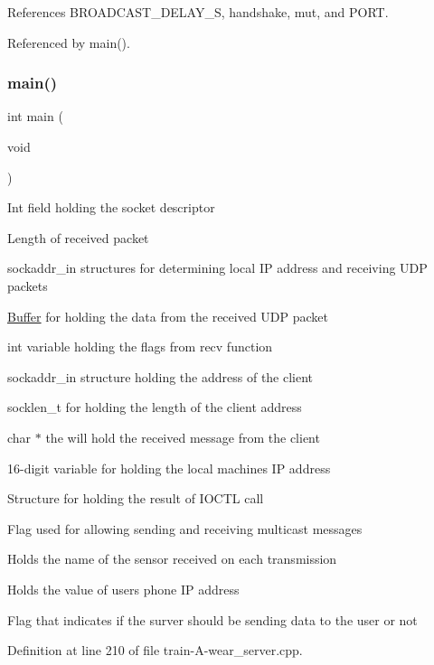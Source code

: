 References B\+R\+O\+A\+D\+C\+A\+S\+T\+\_\+\+D\+E\+L\+A\+Y\+\_\+S, handshake, mut, and P\+O\+RT.



Referenced by main().

\mbox{\label{train-_a-wear__server_8cpp_a840291bc02cba5474a4cb46a9b9566fe}} 
\subsubsection{\texorpdfstring{main()}{main()}}
{\footnotesize\ttfamily int main (\begin{DoxyParamCaption}\item[{void}]{ }\end{DoxyParamCaption})}

Int field holding the socket descriptor

Length of received packet

sockaddr\+\_\+in structures for determining local IP address and receiving U\+DP packets

\mbox{\hyperlink{class_buffer}{Buffer}} for holding the data from the received U\+DP packet

int variable holding the flags from recv function

sockaddr\+\_\+in structure holding the address of the client

socklen\+\_\+t for holding the length of the client address

char $\ast$ the will hold the received message from the client

16-\/digit variable for holding the local machine\textquotesingle{}s IP address

Structure for holding the result of I\+O\+C\+TL call

Flag used for allowing sending and receiving multicast messages

Holds the name of the sensor received on each transmission

Holds the value of user\textquotesingle{}s phone IP address

Flag that indicates if the surver should be sending data to the user or not 

Definition at line 210 of file train-\/\+A-\/wear\+\_\+server.\+cpp.


